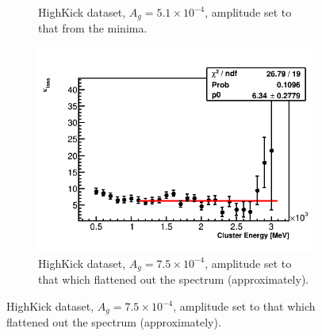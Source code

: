 \begin{landscape}
\begin{figure}[h]
\begin{subfigure}[t]{0.4\textwidth}
        \caption{HighKick dataset, $A_{g} = 5.1 \times 10^{-4}$, amplitude set to that from the \chisq minima.}
    \end{subfigure}
    \hspace{1cm}
    \begin{subfigure}[t]{0.4\textwidth}
        \centering
        \includegraphics[width=\textwidth]{TMethod_kappa_loss_Vs_EBin_Canv_HK-7p5}
        \caption{HighKick dataset, $A_{g} = 7.5 \times 10^{-4}$, amplitude set to that which flattened out the \K spectrum (approximately).}
    \end{subfigure}


\end{figure}
\end{landscape}
